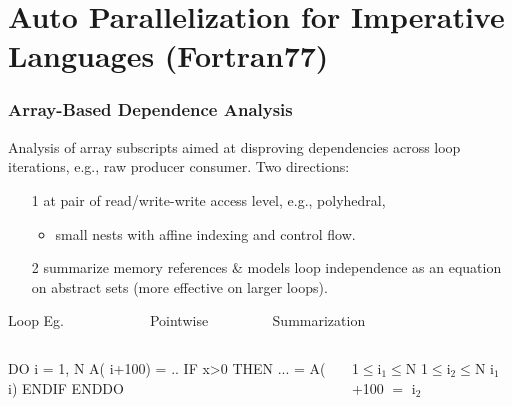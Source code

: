 \documentclass{beamer}
\renewcommand{\emph}[1]{\textcolor{structure}{#1}}
\newcommand{\emp}[1]{\textcolor{DikuRed}{ #1}}
\newcommand{\mymath}[1]{$ #1 $}
\newcommand{\myindx}[1]{_{#1}}
\begin{document}
\section{Auto Parallelization for Imperative Languages (Fortran77)}


\begin{frame}[fragile,t]
  \frametitle{Array-Based Dependence Analysis}

Analysis of array subscripts aimed at disproving
dependencies across loop iterations, e.g., {\sc raw} producer consumer. 
Two directions:\medskip
\begin{itemize}
    \item[1] at pair of read/write-write access level, e.g., polyhedral,
        \begin{itemize}
               \item small nests with affine indexing and control flow.\medskip
        \end{itemize}

    \item[2] summarize memory references \& models loop independence 
                as an equation on abstract sets (more effective on larger loops).
\end{itemize}

\begin{block}{ Loop Eg.{\tt~~~~~~~~~~~~}Pointwise{\tt~~~~~~~~~}Summarization} \vspace{-1ex}
\begin{columns}
\begin{colorcode}[fontsize=\scriptsize]
DO \emph{i = 1, N}
  A(\emp{i+100}) = ..
  IF x>0 THEN
    ... = A(\emp{i})
  ENDIF
ENDDO
\end{colorcode}
\begin{colorcode}[fontsize=\scriptsize]
\emph{1\mymath{\leq}i\mymath{\myindx{1}\leq}N}
\emph{1\mymath{\leq}i\mymath{\myindx{2}\leq}N}
\emp{i\mymath{\myindx{1}}+100 \mymath{=} i\mymath{\myindx{2}}}


\end{colorcode}
\end{columns}
\end{block}
\end{frame}
\end{document}
